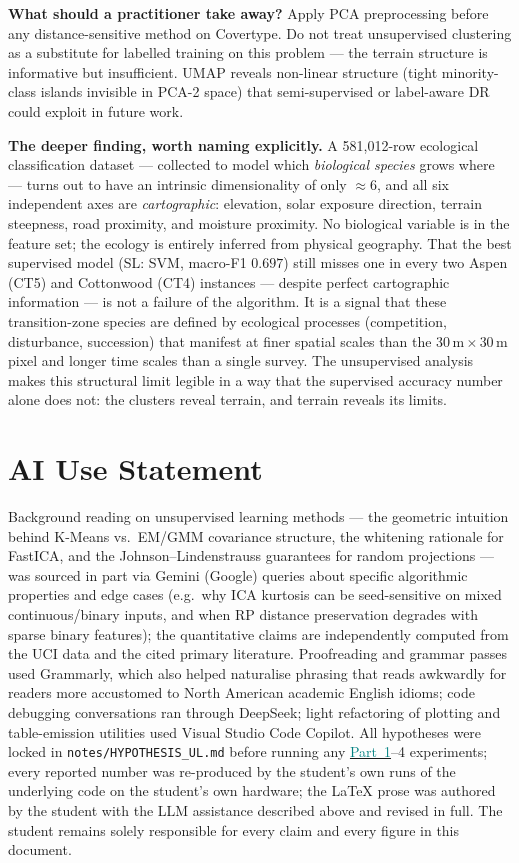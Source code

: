 \documentclass[conference]{IEEEtran}
\newcommand{\partref}[2]{\hyperref[#2]{\textcolor{teal}{Part~#1}}}
\begin{document}
\textbf{What should a practitioner take away?}
Apply PCA preprocessing before any distance-sensitive method on Covertype.
Do not treat unsupervised clustering as a substitute for labelled training
on this problem --- the terrain structure is informative but insufficient.
UMAP reveals non-linear structure (tight minority-class islands invisible
in PCA-2 space) that semi-supervised or label-aware DR could exploit in
future work.

\textbf{The deeper finding, worth naming explicitly.}
A 581{,}012-row ecological classification dataset
--- collected to model which \emph{biological species} grows where ---
turns out to have an intrinsic dimensionality of only $\approx6$,
and all six independent axes are \emph{cartographic}: elevation, solar
exposure direction, terrain steepness, road proximity, and moisture
proximity.
No biological variable is in the feature set; the ecology is entirely
inferred from physical geography.
That the best supervised model (SL: SVM, macro-F1 $0.697$) still misses
one in every two Aspen (CT5) and Cottonwood (CT4) instances --- despite
perfect cartographic information --- is not a failure of the algorithm.
It is a signal that these transition-zone species are defined by
ecological processes (competition, disturbance, succession) that manifest
at finer spatial scales than the $30\,\mathrm{m} \times 30\,\mathrm{m}$
pixel and longer time scales than a single survey.
The unsupervised analysis makes this structural limit legible in a way
that the supervised accuracy number alone does not:
the clusters reveal terrain, and terrain reveals its limits.

\section*{AI Use Statement}
Background reading on unsupervised learning methods --- the geometric
intuition behind K-Means vs.\ EM/GMM covariance structure, the whitening
rationale for FastICA, and the Johnson--Lindenstrauss guarantees for random
projections --- was sourced in part via Gemini (Google) queries about specific
algorithmic properties and edge cases (e.g.\ why ICA kurtosis can be
seed-sensitive on mixed continuous/binary inputs, and when RP distance
preservation degrades with sparse binary features); the quantitative claims
are independently computed from the UCI data and the cited primary literature.
Proofreading and grammar passes used Grammarly, which also helped
naturalise phrasing that reads awkwardly for readers more accustomed to
North American academic English idioms;
code debugging conversations ran through DeepSeek;
light refactoring of plotting and table-emission utilities used Visual Studio
Code Copilot.
All hypotheses were locked in \texttt{notes/HYPOTHESIS\_UL.md} before
running any \partref{1}{sec:p1}--4 experiments; every reported number was re-produced by
the student's own runs of the underlying code on the student's own hardware;
the \LaTeX{} prose was authored by the student with the LLM assistance
described above and revised in full.
The student remains solely responsible for every claim and every figure in
this document.
\end{document}
